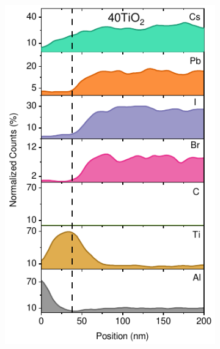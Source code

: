 \begin{figure}[htbp]
    \centering
    \begin{subfigure}{0.32\textwidth}
        \centering
        \includegraphics[width=\textwidth]{chapters/transport_layers/images/TEM_40TiO2.pdf}
        \caption{}
        \label{}
    \end{subfigure}
    \hfill
    \begin{subfigure}{0.32\textwidth}
        \centering

\end{subfigure}
\end{figure}
